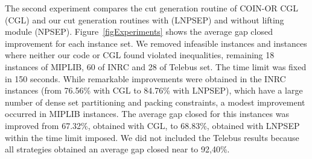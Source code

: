 \documentclass{endm}
\begin{document}
The second experiment compares the cut generation routine of COIN-OR CGL (CGL) and our cut generation routines with (LNPSEP) and without lifting module (NPSEP). Figure~\ref{figExperiments} shows the average gap closed improvement for each instance set. We removed infeasible instances and instances where neither our code or CGL found violated inequalities, remaining 18 instances of MIPLIB, 60 of INRC and 28 of Telebus set. The time limit was fixed in 150 seconds. While remarkable improvements were obtained in the INRC instances (from 76.56\% with CGL to 84.76\% with LNPSEP), which have a large number of dense set partitioning and packing constraints, a modest improvement occurred in MIPLIB instances. The average gap closed for this instances was improved from 67.32\%, obtained with CGL, to 68.83\%, obtained with LNPSEP within the time limit imposed. We did not included the Telebus results because all strategies obtained an average gap closed near to 92,40\%.
\end{document}
